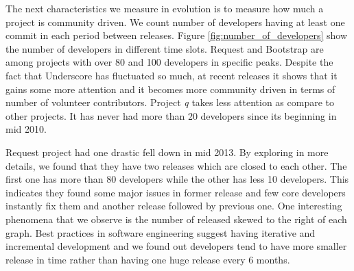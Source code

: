 The next characteristics we measure in evolution is to measure how much a project is community driven. We count number of developers having at least one commit in each period between releases. Figure \ref{fig:number_of_developers} show the number of developers in different time slots. Request and Bootstrap are among projects with over 80 and 100 developers in specific peaks. Despite the fact that Underscore has fluctuated so much, at recent releases it shows that it gains some more attention and it becomes more community driven in terms of number of volunteer contributors. Project \textit{q} takes less attention as compare to other projects. It has never had more than 20 developers since its beginning in mid 2010.
\par
Request project had one drastic fell down in mid 2013. By exploring in more details, we found that they have two releases which are closed to each other. The first one has more than 80 developers while the other has less 10 developers. This indicates they found some major issues in former release and few core developers instantly fix them and another release followed by previous one. One interesting phenomena that we observe is the number of released skewed to the right of each graph. Best practices in software engineering suggest having iterative and incremental development and we found out developers tend to have more smaller release in time rather than having one huge release every 6 months.  
